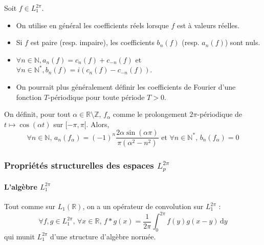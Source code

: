   \begin{remark}
    Soit $f \in L_1^{2\pi}$.
    \begin{itemize}
      \item On utilise en général les coefficients réels lorsque $f$ est à valeurs réelles.
      \item Si $f$ est paire (resp. impaire), les coefficients $b_n(f)$ (resp. $a_n(f)$) sont nuls.
      \item $\forall n \in \mathbb{N}, a_n(f) = c_n(f) + c_{-n}(f)$ et $\forall n \in \mathbb{N}^*, b_n(f) = i(c_n(f) - c_{-n}(f))$.
      \item On pourrait plus généralement définir les coefficients de Fourier d'une fonction $T$-périodique pour toute période $T > 0$.
    \end{itemize}
  \end{remark}


  \begin{example}
    On définit, pour tout $\alpha \in \mathbb{R} \setminus \mathbb{Z}$, $f_\alpha$ comme le prolongement $2\pi$-périodique de $t\mapsto\cos(\alpha t)$ sur $[-\pi,\pi[$. Alors,
    \[ \forall n \in \mathbb{N}, \, a_n(f_\alpha) = (-1)^n \frac{2 \alpha \sin(\alpha \pi)}{\pi (\alpha^2 - n^2)} \text{ et } \forall n \in \mathbb{N}^*, \, b_n(f_\alpha) = 0 \]
  \end{example}

  \subsubsection{Propriétés structurelles des espaces \texorpdfstring{$L_p^{2 \pi}$}{Lₚ²ᵖⁱ}}

  \paragraph{L'algèbre \texorpdfstring{$L_1^{2 \pi}$}{L₁²ᵖⁱ}}


  \begin{proposition}
    Tout comme sur $L_1(\mathbb{R})$, on a un opérateur de convolution sur $L_1^{2 \pi}$ :
    \[ \forall f, g \in L_1^{2 \pi}, \, \forall x \in \mathbb{R}, \, f*g(x) = \frac{1}{2 \pi} \int_0^{2\pi} f(y) g(x - y) \, \mathrm{d}y \]
    qui munit $L_1^{2 \pi}$ d'une structure d'algèbre normée.
  \end{proposition}



